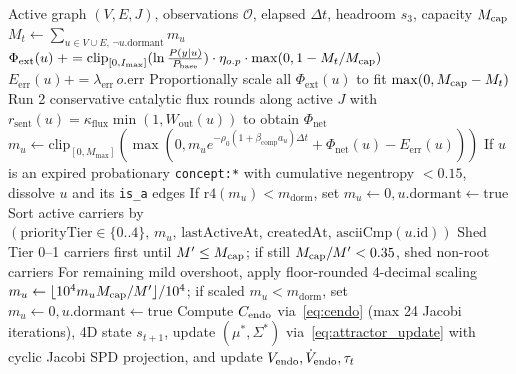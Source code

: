 \begin{algorithm}[H]
\caption{Priority-Stratified Conserved Informational Metabolism and SPD Viability Update (Law~2)}
\label{alg:metab}
\begin{algorithmic}[1]
\Require Active graph $(V, E, J)$, observations $\mathcal{O}$, elapsed $\Delta t$, headroom $s_3$, capacity $M_{\mathrm{cap}}$
\State $M_t \leftarrow \sum_{u \in V \cup E,\,\neg u.\mathrm{dormant}} m_u$ 
  \State $\Phi_{\mathrm{ext}}(u) \mathrel{+=} \mathrm{clip}_{[0, I_{\max}]}(\ln\frac{P(y|u)}{P_{\mathrm{base}}}) \cdot \eta_{o.p} \cdot \max(0, 1 - M_t / M_{\mathrm{cap}})$ 
  \State $E_{\mathrm{err}}(u) \mathrel{+=} \lambda_{\mathrm{err}}\, o.\mathrm{err}$
\EndFor
{}
  \State Proportionally scale all $\Phi_{\mathrm{ext}}(u)$ to fit $\max(0, M_{\mathrm{cap}} - M_t)$
\EndIf
\State Run 2 conservative catalytic flux rounds along active $J$ with $r_{\mathrm{sent}}(u) = \kappa_{\mathrm{flux}} \min(1, W_{\mathrm{out}}(u))$ to obtain $\Phi_{\mathrm{net}}$
  \State $m_u \leftarrow \mathrm{clip}_{[0, M_{\max}]}(\max(0, m_u e^{-\rho_0(1+\beta_{\mathrm{comp}} a_u)\Delta t} + \Phi_{\mathrm{net}}(u) - E_{\mathrm{err}}(u)))$
  \State If $u$ is an expired probationary \texttt{concept:*} with cumulative negentropy $< 0.15$, dissolve $u$ and its \texttt{is\_a} edges
  \State If $\mathrm{r4}(m_u) < m_{\mathrm{dorm}}$, set $m_u \leftarrow 0, u.\mathrm{dormant} \leftarrow \mathrm{true}$
\EndFor
{}
  \State Sort active carriers by $(\mathrm{priorityTier} \in \{0..4\},\, m_u,\, \mathrm{lastActiveAt},\, \mathrm{createdAt},\, \mathrm{asciiCmp}(u.\mathrm{id}))$
  \State Shed Tier 0--1 carriers first until $M' \le M_{\mathrm{cap}}$; if still $M_{\mathrm{cap}} / M' < 0.35$, shed non-root carriers
  \State For remaining mild overshoot, apply floor-rounded 4-decimal scaling $m_u \leftarrow \lfloor 10^4 m_u M_{\mathrm{cap}} / M' \rfloor / 10^4$; if scaled $m_u < m_{\mathrm{dorm}}$, set $m_u \leftarrow 0, u.\mathrm{dormant} \leftarrow \mathrm{true}$
\EndIf
\State Compute $C_{\mathrm{endo}}$ via~\eqref{eq:cendo} (max 24 Jacobi iterations), 4D state $s_{t+1}$, update $(\mu^*, \Sigma^*)$ via~\eqref{eq:attractor_update} with cyclic Jacobi SPD projection, and update $V_{\mathrm{endo}}, \dot{V}_{\mathrm{endo}}, \tau_t$
\end{algorithmic}
\end{algorithm}

